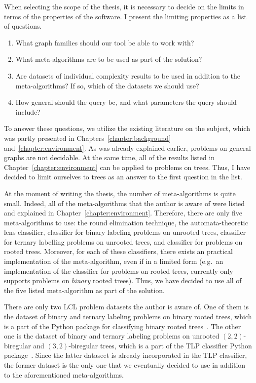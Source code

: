 When selecting the scope of the thesis, it is necessary
to decide on the limits
in terms of the properties of the software. I present the limiting properties
as a list of questions.

\begin{enumerate}
  \item What graph families should our tool be able to work with?
  \item What meta-algorithms are to be used as part of the solution?
  \item Are datasets of individual complexity results to be used
  in addition to the meta-algorithms? If so, which of the datasets we should use?
  \item How general should the query be, and what parameters the query should include?
\end{enumerate}

To answer these questions, we utilize the existing literature on the subject, which was partly presented in Chapters~\ref{chapter:background} and~\ref{chapter:environment}. As was already explained earlier, problems on general graphs are not decidable. At the same time, all of the results listed in Chapter~\ref{chapter:environment} can be applied to problems on trees. Thus,
I have decided to limit ourselves to trees as an answer to the first question in the list.

At the moment of writing the thesis, the number of meta-algorithms is
quite small. Indeed, all of the meta-algorithms that the author is aware of were listed and explained in Chapter~\ref{chapter:environment}. Therefore, there are only five meta-algorithms to use: the round elimination technique, the automata-theoretic lens classifier, classifier for binary labeling problems on unrooted trees, classifier for ternary labelling problems on unrooted trees, and classifier for problems on rooted trees. Moreover, for each of these classifiers, there exists an practical implementation of the meta-algorithm, even if in a limited form (e.g.\ an implementation of the classifier for problems on rooted trees, currently only supports problems on \emph{binary} rooted trees). Thus, we have decided to use all of the five listed meta-algorithm as part of the solution.

There are only two LCL problem datasets the author is aware of. One of them is the dataset of binary and ternary labeling problems on binary rooted trees, which is a
part of the Python package for classifying binary rooted trees~\cite{Tereshchenko2020brt}. The other one is the dataset of binary and ternary labeling problems on
unrooted $(2, 2)$-biregular and $(3, 2)$-biregular trees, which is a part of the TLP classifier Python package~\cite{Rocher2020clas}. Since the latter dataseet is already incorporated in the TLP classifier,
the former dataset is the only one that we eventually decided to use
in addition to the aforementioned meta-algorithms.


